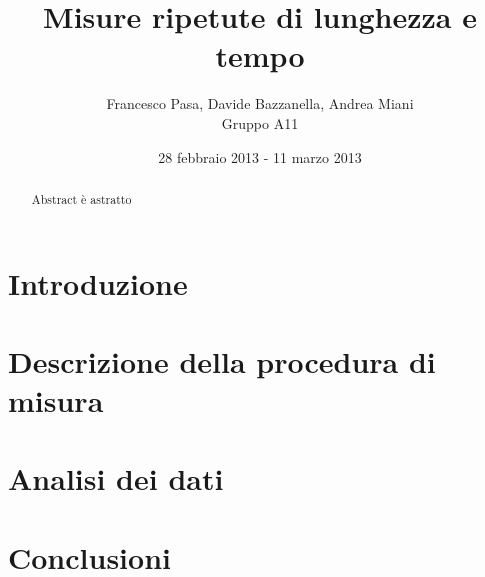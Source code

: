 \documentclass[12pt, twoside, a4paper]{article}
\begin{document}
\title{Misure ripetute di lunghezza e tempo}
\author{Francesco Pasa, Davide Bazzanella, Andrea Miani\\
Gruppo A11}
\date{28 febbraio 2013 - 11 marzo 2013}
\maketitle

\begin{abstract}
Abstract è astratto
\end{abstract}

\section{Introduzione}

\section{Descrizione della procedura di misura}

\section{Analisi dei dati}

\section{Conclusioni}
\end{document}
